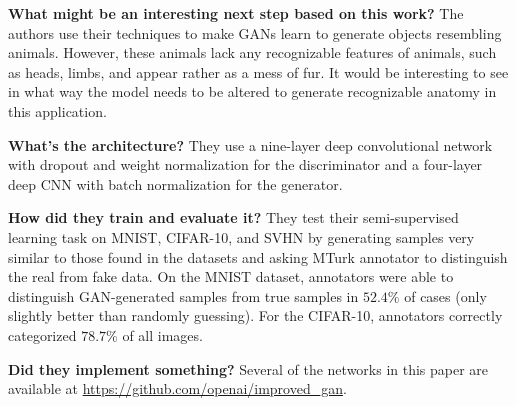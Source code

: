 \noindent\textbf{What might be an interesting next step based on this work?}
The authors use their techniques to make GANs learn to generate objects
resembling animals. However, these animals lack any recognizable features of
animals, such as heads, limbs, and appear rather as a mess of fur. It would be
interesting to see in what way the model needs to be altered to generate
recognizable anatomy in this application.

\noindent\textbf{What's the architecture?} They use a nine-layer deep
convolutional network with dropout and weight normalization for the
discriminator and a four-layer deep CNN with batch normalization for the
generator.

\noindent\textbf{How did they train and evaluate it?} They test their
semi-supervised learning task on MNIST, CIFAR-10, and SVHN by generating samples
very similar to those found in the datasets and asking MTurk annotator to
distinguish the real from fake data. On the MNIST dataset, annotators were able
to distinguish GAN-generated samples from true samples in $52.4\%$ of cases
(only slightly better than randomly guessing). For the CIFAR-10, annotators
correctly categorized $78.7\%$ of all images.


\noindent\textbf{Did they implement something?} Several of the networks in this
paper are available at \url{https://github.com/openai/improved_gan}. 

